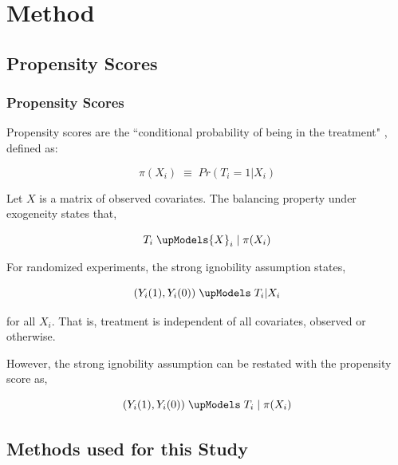 \documentclass[10pt,handout,mathserif]{beamer}
\begin{document}
\section{Method}

\subsection{Propensity Scores}

\begin{frame}
	\frametitle{Propensity Scores}
    Propensity scores are the ``conditional probability of being in the treatment" \cite{RosenbaumRubin1983}, defined as:
    
    \begin{equation}
    \pi ({ X }_{ i }) \; \equiv \; Pr({ T }_{ i } = 1 | { X }_{ i })
    \end{equation}
    \pause
    
    Let $X$ is a matrix of observed covariates. The balancing property under exogeneity states that,

    \begin{equation}
    { T }_{ i } \; \upModels { X }_{ i } \;| \; \pi ({ X }_{ i })
    \end{equation}
    
    \pause
    For randomized experiments, the strong ignobility assumption states,

    \begin{equation}
    ({ Y }_{ i }(1),{ Y }_{ i }(0)) \; \upModels \; { T }_{ i }|{ X }_{ i }
    \end{equation}

    for all ${X}_{i}$. That is, treatment is independent of all covariates, observed or otherwise. 
    
    \pause
    However, the strong ignobility assumption can be restated with the propensity score as,

    \begin{equation}
    ({ Y }_{ i }(1),{ Y }_{ i }(0)) \; \upModels \; { T }_{ i } \; | \; \pi({ X }_{ i })
    \end{equation}

\end{frame}

\subsection{Methods used for this Study}
\end{document}
